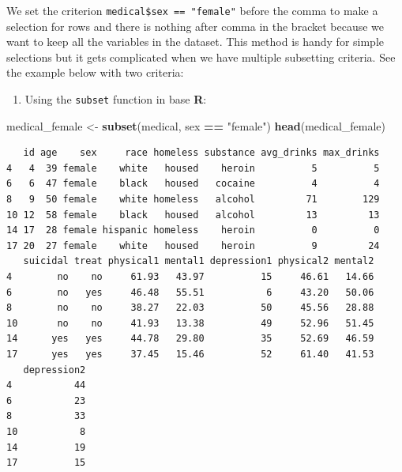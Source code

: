 \documentclass[]{book}
\newenvironment{Shaded}{\begin{snugshade}}{\end{snugshade}}
\newcommand{\DecValTok}[1]{\textcolor[rgb]{0.00,0.00,0.81}{#1}}
\newcommand{\KeywordTok}[1]{\textcolor[rgb]{0.13,0.29,0.53}{\textbf{#1}}}
\newcommand{\NormalTok}[1]{#1}
\newcommand{\OperatorTok}[1]{\textcolor[rgb]{0.81,0.36,0.00}{\textbf{#1}}}
\newcommand{\StringTok}[1]{\textcolor[rgb]{0.31,0.60,0.02}{#1}}
\providecommand{\tightlist}{%
  \setlength{\itemsep}{0pt}\setlength{\parskip}{0pt}}
\begin{document}
We set the criterion \texttt{medical\$sex\ ==\ "female"} before the comma to make a selection for rows and there is nothing after comma in the bracket because we want to keep all the variables in the dataset. This method is handy for simple selections but it gets complicated when we have multiple subsetting criteria. See the example below with two criteria:

\begin{Shaded}
\end{Shaded}

\begin{enumerate}
\def\labelenumi{\arabic{enumi}.}
\setcounter{enumi}{1}
\tightlist
\item
  Using the \texttt{subset} function in base \textbf{R}:
\end{enumerate}

\begin{Shaded}
\begin{Highlighting}[]
\NormalTok{medical_female <-}\StringTok{ }\KeywordTok{subset}\NormalTok{(medical, sex }\OperatorTok{==}\StringTok{ "female"}\NormalTok{)}
\KeywordTok{head}\NormalTok{(medical_female)}
\end{Highlighting}
\end{Shaded}

\begin{verbatim}
   id age    sex     race homeless substance avg_drinks max_drinks
4   4  39 female    white   housed    heroin          5          5
6   6  47 female    black   housed   cocaine          4          4
8   9  50 female    white homeless   alcohol         71        129
10 12  58 female    black   housed   alcohol         13         13
14 17  28 female hispanic homeless    heroin          0          0
17 20  27 female    white   housed    heroin          9         24
   suicidal treat physical1 mental1 depression1 physical2 mental2
4        no    no     61.93   43.97          15     46.61   14.66
6        no   yes     46.48   55.51           6     43.20   50.06
8        no    no     38.27   22.03          50     45.56   28.88
10       no    no     41.93   13.38          49     52.96   51.45
14      yes   yes     44.78   29.80          35     52.69   46.59
17      yes   yes     37.45   15.46          52     61.40   41.53
   depression2
4           44
6           23
8           33
10           8
14          19
17          15
\end{verbatim}
\end{document}
